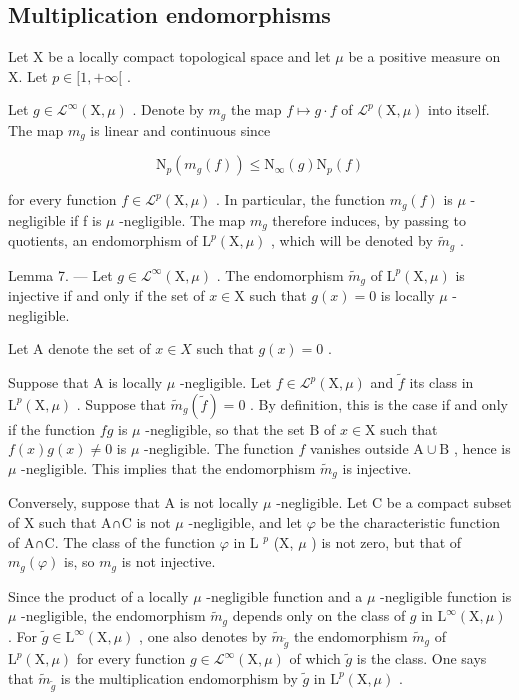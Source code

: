 \subsection{Multiplication endomorphisms}

Let X be a locally compact topological space and let \(\mu\) be a positive measure on X. Let \(p \in [1, +\infty[\) .

Let \(g \in \mathcal{L}^{\infty}(\mathrm{X},\mu)\) . Denote by \(m_{g}\) the map \(f \mapsto g \cdot f\) of \(\mathcal{L}^{p}(\mathrm{X},\mu)\) into itself. The map \(m_{g}\) is linear and continuous since

\[
\mathrm{N} _ {p} (m _ {g} (f)) \leqslant \mathrm{N} _ {\infty} (g) \mathrm{N} _ {p} (f)\tag{1}
\]

for every function \(f \in \mathcal{L}^{p}(\mathrm{X}, \mu)\) . In particular, the function \(m_{g}(f)\) is \(\mu\) -negligible if f is \(\mu\) -negligible. The map \(m_{g}\) therefore induces, by passing to quotients, an endomorphism of \(\mathrm{L}^{p}(\mathrm{X}, \mu)\) , which will be denoted by \(\widetilde{m}_{g}\) .

Lemma 7. --- Let \(g \in \mathcal{L}^{\infty}(\mathrm{X},\mu)\) . The endomorphism \(\tilde{m}_g\) of \(\mathrm{L}^{p}(\mathrm{X},\mu)\) is injective if and only if the set of \(x \in \mathrm{X}\) such that \(g(x) = 0\) is locally \(\mu\) -negligible.

Let A denote the set of \(x \in X\) such that \(g(x) = 0\) .

Suppose that A is locally \(\mu\) -negligible. Let \(f \in \mathcal{L}^p(\mathrm{X}, \mu)\) and \(\widetilde{f}\) its class in \(\mathrm{L}^p(\mathrm{X}, \mu)\) . Suppose that \(\widetilde{m}_g(\widetilde{f}) = 0\) . By definition, this is the case if and only if the function \(fg\) is \(\mu\) -negligible, so that the set B of \(x \in \mathrm{X}\) such that \(f(x)g(x) \neq 0\) is \(\mu\) -negligible. The function \(f\) vanishes outside \(\mathrm{A} \cup \mathrm{B}\) , hence is \(\mu\) -negligible. This implies that the endomorphism \(\widetilde{m}_g\) is injective.

Conversely, suppose that A is not locally \(\mu\) -negligible. Let C be a compact subset of X such that A∩C is not \(\mu\) -negligible, and let \(\varphi\) be the characteristic function of A∩C. The class of the function \(\varphi\) in L \(^{p}\) (X, \(\mu\) ) is not zero, but that of \(m_{g}(\varphi)\) is, so \(m_{g}\) is not injective.

Since the product of a locally \(\mu\) -negligible function and a \(\mu\) -negligible function is \(\mu\) -negligible, the endomorphism \(\widetilde{m}_g\) depends only on the class of \(g\) in \(\mathrm{L}^{\infty}(\mathrm{X},\mu)\) . For \(\widetilde{g}\in \mathrm{L}^{\infty}(\mathrm{X},\mu)\) , one also denotes by \(\widetilde{m}_{\widetilde{g}}\) the endomorphism \(\widetilde{m}_g\) of \(\mathrm{L}^p (\mathrm{X},\mu)\) for every function \(g\in \mathcal{L}^{\infty}(\mathrm{X},\mu)\) of which \(\widetilde{g}\) is the class. One says that \(\widetilde{m}_{\widetilde{g}}\) is the multiplication endomorphism by \(\widetilde{g}\) in \(\mathrm{L}^p (\mathrm{X},\mu)\) .

